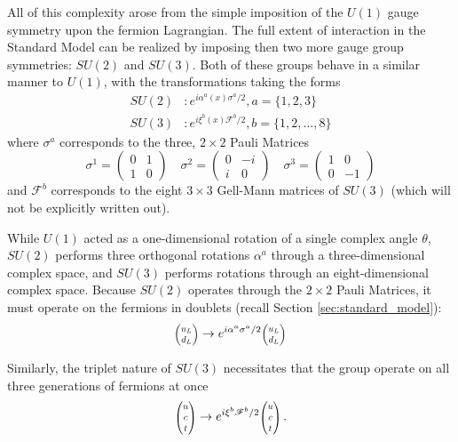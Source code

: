     All of this complexity arose from the simple imposition of the $U(1)$ gauge symmetry upon the fermion Lagrangian.
    The full extent of interaction in the Standard Model can be realized by imposing then two more gauge group symmetries:
        $SU(2)$ and $SU(3)$.
    Both of these groups behave in a similar manner to $U(1)$, with the transformations taking the forms
    \begin{equation} \begin{split}
        SU(2)&: e^{i \alpha^a(x) \sigma^a / 2}, a=\{1,2,3\}
        \\SU(3)&: e^{i \xi^b(x) \mathscr{F}^b / 2}, b=\{1,2, ..., 8\}
    \end{split} \end{equation}
    where $\sigma^a$ corresponds to the three, $2 \times 2$ Pauli Matrices
    \begin{equation}
        \sigma^1 = \begin{pmatrix} 0 & 1 \\ 1 & 0 \end{pmatrix} \quad
        \sigma^2 = \begin{pmatrix} 0 & -i \\ i & 0 \end{pmatrix} \quad
        \sigma^3 = \begin{pmatrix} 1 & 0 \\ 0 & -1 \end{pmatrix}
    \end{equation}
    and $\mathscr{F}^b$ corresponds to the eight $3 \times 3$ Gell-Mann matrices of $SU(3)$
        (which will not be explicitly written out).

    While $U(1)$ acted as a one-dimensional rotation of a single complex angle $\theta$,
        $SU(2)$ performs three orthogonal rotations $\alpha^a$ through a three-dimensional complex space,
        and $SU(3)$ performs rotations through an eight-dimensional complex space.
    Because $SU(2)$ operates through the $2 \times 2$ Pauli Matrices, it must operate on the fermions in doublets
        (recall Section \ref{sec:standard_model}):
    \begin{equation}
        \minimatrix{u_L \\ d_L} \to e^{i \alpha^a \sigma^a / 2} \minimatrix{u_L \\ d_L}
    \end{equation}

    Similarly, the triplet nature of $SU(3)$ necessitates that the group operate on all three generations of fermions at once
    \begin{equation}
        \minimatrix{u\\c\\t} \to e^{i \xi^b \mathscr{F}^b / 2} \minimatrix{u\\c\\t}
        \,.
    \end{equation}

